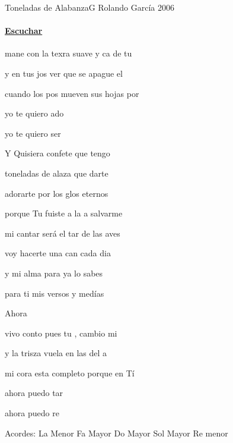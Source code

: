 \documentclass[12pt, spanish]{book}
\newcommand{\NotCCLIed}{\relax}
\begin{document}
    \begin{song}{Toneladas de Alabanza}{G}
    {} %
    {Rolando García}
    {} %
    {2006} %
        \ifChordBk

        \paragraph{\mbox{}\hfill\protect\href{https://open.spotify.com/intl-es/track/3XAmFbBUzbQ97lHOTyDhR5}{Escuchar}\mbox{}\hfill}
        \fi

        \begin{SBOpGroup}
            mane con la texra suave y ca de tu 

            y en tus jos ver que  se apague el 

            cuando los pos mueven sus hojas por 

            yo te quiero ado

            yo te quiero ser
        \end{SBOpGroup}

        \begin{SBChorus}
            Y Quisiera confete que tengo

            toneladas de alaza que darte

            adorarte por los glos eternos

            porque Tu fuiste a la  a salvarme

            mi cantar será el tar de las aves

            voy hacerte una can cada dia

            y mi alma para  ya lo sabes

            para ti mis versos y medías
        \end{SBChorus}

        \begin{SBOpGroup}
            Ahora 

            vivo conto pues tu , cambio mi 

            y la trisza vuela en las del a

            mi cora esta completo porque en Tí

            ahora puedo tar

            ahora puedo re
        \end{SBOpGroup}

        \ifChordBk
        \begin{SBOpGroup}
            Acordes:\break
            \upchord{\Am}\qquad La Menor \hfill
            \upchord{\F}\qquad Fa Mayor \hfill\null\break
            \upchord{\C}\qquad Do Mayor \hfill
            \upchord{\G}\qquad Sol Mayor \hfill
            \upchord{\Dm}\qquad Re menor  \hfill\null\break
        \end{SBOpGroup}
        \fi
    \end{song}
\end{document}
